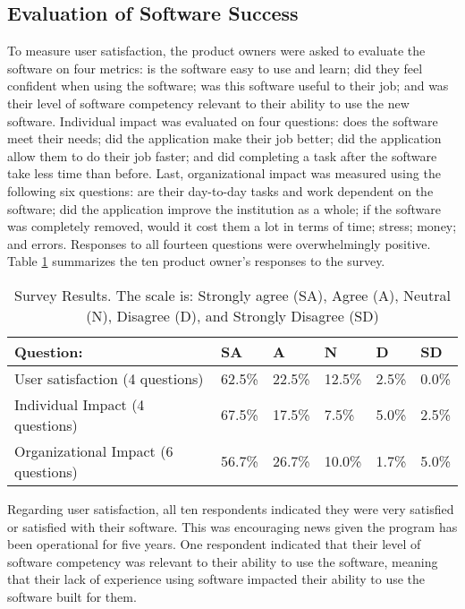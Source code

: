 \subsection{Evaluation of Software Success}
 To measure user satisfaction, the product owners were asked to evaluate the software on four metrics: is the software easy to use and learn; did they feel confident when using the software; was this software useful to their job; and was their level of software competency relevant to their ability to use the new software. Individual impact was evaluated on four questions: does the software meet their needs; did the application make their job better; did the application allow them to do their job faster; and did completing a task after the software take less time than before. Last, organizational impact was measured using the following six questions: are their day-to-day tasks and work dependent on the software; did the application improve the institution as a whole; if the software was completely removed, would it cost them a lot in terms of time;  stress;  money; and errors. Responses to all fourteen questions were overwhelmingly positive. Table \ref{tab:surveyResults} summarizes the ten product owner's responses to the survey. 

\begin{table}
\caption{Survey Results. The scale is: Strongly agree (SA), Agree (A), Neutral (N), Disagree (D), and Strongly Disagree (SD)}
\label{tab:surveyResults}
\begin{tabular}{p{3.0cm}p{.6cm}p{.6cm}p{.6cm}p{.6cm}p{.6cm}}
Question: & SA & A & N & D & SD \\
 \hline
User satisfaction \newline(4 questions) & 62.5\% & 22.5\% & 12.5\% & 2.5\% & 0.0\% \\
Individual Impact \newline(4 questions) & 67.5\% & 17.5\% & 7.5\% & 5.0\% & 2.5\% \\
Organizational Impact \newline(6 questions) & 56.7\% & 26.7\% & 10.0\% & 1.7\% & 5.0\% \\
\end{tabular}
\end{table}

Regarding user satisfaction, all ten respondents indicated they were very satisfied or satisfied with their software. This was encouraging news given the program has been operational for five years. One respondent indicated that their level of software competency was relevant to their ability to use the software, meaning that their lack of experience using software impacted their ability to use the software built for them. 

